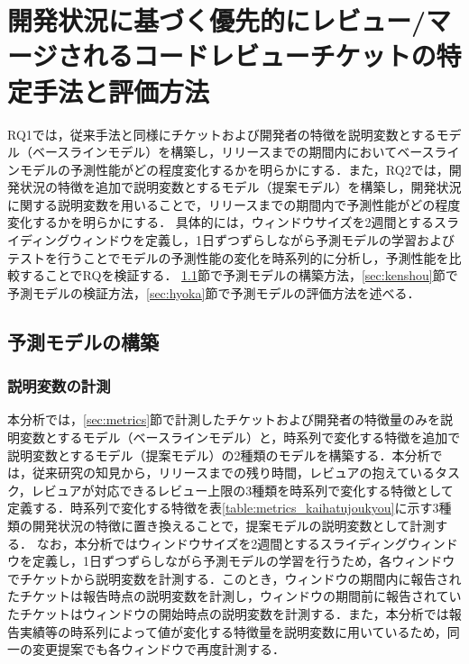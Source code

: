\documentclass[submit]{ipsj}
\begin{document}


\chapter{開発状況に基づく優先的にレビュー/マージされるコードレビューチケットの特定手法と評価方法}\label{sec:analysis_method}

RQ1では，従来手法と同様にチケットおよび開発者の特徴を説明変数とするモデル（ベースラインモデル）を構築し，リリースまでの期間内においてベースラインモデルの予測性能がどの程度変化するかを明らかにする．また，RQ2では，開発状況の特徴を追加で説明変数とするモデル（提案モデル）を構築し，開発状況に関する説明変数を用いることで，リリースまでの期間内で予測性能がどの程度変化するかを明らかにする．
具体的には，ウィンドウサイズを2週間とするスライディングウィンドウを定義し，1日ずつずらしながら予測モデルの学習およびテストを行うことでモデルの予測性能の変化を時系列的に分析し，予測性能を比較することでRQを検証する．
\ref{sec:koutiku}節で予測モデルの構築方法，\ref{sec:kenshou}節で予測モデルの検証方法，\ref{sec:hyoka}節で予測モデルの評価方法を述べる．


\section{予測モデルの構築}\label{sec:koutiku}

\subsection{説明変数の計測}\label{sec:setumeihensuu}
本分析では，\ref{sec:metrics}節で計測したチケットおよび開発者の特徴量のみを説明変数とするモデル（ベースラインモデル）と，時系列で変化する特徴を追加で説明変数とするモデル（提案モデル）の2種類のモデルを構築する．本分析では，従来研究\cite{integrator}\cite{release_merge}の知見から，リリースまでの残り時間，レビュアの抱えているタスク，レビュアが対応できるレビュー上限の3種類を時系列で変化する特徴として定義する．時系列で変化する特徴を表\ref{table:metrics_kaihatujoukyou}に示す3種類の開発状況の特徴に置き換えることで，提案モデルの説明変数として計測する．
なお，本分析ではウィンドウサイズを2週間とするスライディングウィンドウを定義し，1日ずつずらしながら予測モデルの学習を行うため，各ウィンドウでチケットから説明変数を計測する．このとき，ウィンドウの期間内に報告されたチケットは報告時点の説明変数を計測し，ウィンドウの期間前に報告されていたチケットはウィンドウの開始時点の説明変数を計測する．また，本分析では報告実績等の時系列によって値が変化する特徴量を説明変数に用いているため，同一の変更提案でも各ウィンドウで再度計測する．
\end{document}
